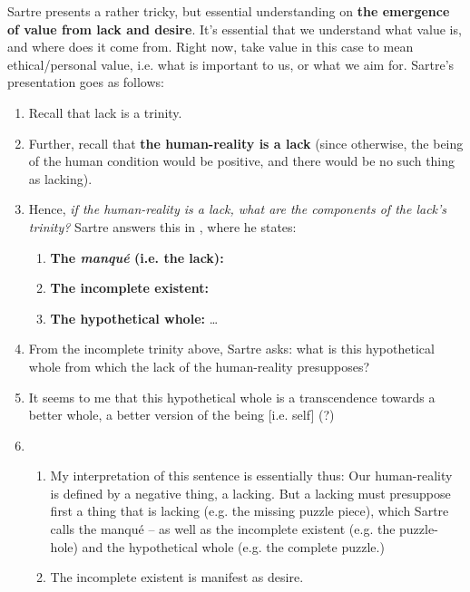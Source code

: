 Sartre presents a rather tricky, but essential understanding on \textbf{the emergence of value from lack and desire}. It's essential that we understand what value is, and where does it come from. Right now, take value in this case to mean ethical/personal value, i.e. what is important to us, or what we aim for. Sartre's presentation goes as follows:
\begin{enumerate}
  \item Recall that lack is a trinity.
  \item Further, recall that \textbf{the human-reality is a lack} (since otherwise, the being of the human condition would be positive, and there would be no such thing as lacking).
  \item Hence, \emph{if the human-reality is a lack, what are the components of the lack's trinity?} Sartre answers this in \autocite[140]{sartre}, where he states:
  \begin{enumerate}
    \item \textbf{The \emph{manqué} (i.e. the lack):} 
    \item \textbf{The incomplete existent:} 
    \item \textbf{The hypothetical whole:} \ldots
  \end{enumerate}
  \item From the incomplete trinity above, Sartre asks: what is this hypothetical whole from which the lack of the human-reality presupposes?
  \item It seems to me that this hypothetical whole is a transcendence towards a better whole, a better version of the being [i.e. self] (?)
  \item {}
  \begin{enumerate}
    \item My interpretation of this sentence is essentially thus: Our human-reality is defined by a negative thing, a lacking. But a lacking must presuppose first a thing that is lacking (e.g. the missing puzzle piece), which Sartre calls the manqué -- as well as the incomplete existent (e.g. the puzzle-hole) and the hypothetical whole (e.g. the complete puzzle.)
    \item The incomplete existent is manifest as desire.

\end{enumerate}
\end{enumerate}
